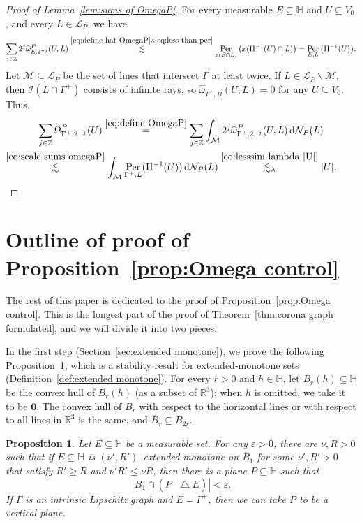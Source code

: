 \documentclass[11pt,reqno]{amsart}
\newcommand{\wwidehat}[1]{\widehat{#1}}
\renewcommand{\H}{\mathbb{H}}
\newcommand{\R}{\mathbb{R}}
\newcommand{\Z}{\mathbb{Z}}
\newcommand{\cI}{\mathcal{I}}
\newcommand{\cL}{\mathcal{L}}
\newcommand{\cM}{\mathcal{M}}
\newcommand{\cN}{\mathcal{N}}
\renewcommand{\epsilon}{\varepsilon}
\newcommand{\ud}[0]{\,\mathrm{d}}
\newcommand{\0}{\mathbf{0}}
\renewcommand{\1}{\mathbf 1}
\newcommand{\symdiff}{\mathbin{\triangle}}
\renewcommand{\subset}{\subseteq}
\renewcommand{\ge}{\geqslant}
\renewcommand{\le}{\leqslant}
\renewcommand{\setminus}{\smallsetminus}
\newtheorem{prop}[thm]{Proposition}
\theoremstyle{remark}
\DeclareMathOperator{\Per}{Per}
\begin{document}
\begin{proof}[{Proof of Lemma~\ref{lem:sums of OmegaP}}]
For every measurable $E\subset \H$ and $U\subset V_0$, and every $L\in \cL_P$, we have
  \begin{equation}\label{eq:scale sums omegaP}
    \sum_{j\in \Z} 2^j \wwidehat{\omega}^P_{E, 2^{-j}}(U, L) \stackrel{\eqref{eq:define hat OmegaP}\wedge \eqref{eq:less than per}}{\lesssim} \Per_{x(E\cap L)}\big(x(\Pi^{-1}(U)\cap L)\big) = \Per_{E,L}\big(\Pi^{-1}(U)\big).
  \end{equation}
 Let $\cM\subset \cL_P$ be the set of lines that intersect $\Gamma$ at least twice.  If $L\in \cL_P\setminus \cM$, then $\cI(L\cap \Gamma^+)$ consists of infinite rays, so $\widehat{\omega}_{\Gamma^+, R}(U,L)=0$ for any $U\subset V_0$.  Thus,
  \begin{multline*}
    \sum_{j\in \Z} \Omega^P_{\Gamma^+,2^{-j}}(U)
    \stackrel{\eqref{eq:define OmegaP}}{=}\sum_{j\in \Z} \int_{\cM} 2^j \wwidehat{\omega}^P_{\Gamma^+,2^{-j}}(U,L) \ud \cN_P(L) \\
    \stackrel{\eqref{eq:scale sums omegaP}}{\lesssim} \int_{\cM} \Per_{\Gamma^+,L}(\Pi^{-1}(U))\ud \cN_P(L)
    \stackrel{\eqref{eq:lesssim lambda |U|}}{\lesssim_\lambda} |U|. \tag*{\qedhere}
  \end{multline*}
\end{proof}

\section{Outline of proof of Proposition~\ref{prop:Omega control}}\label{sec:omega control outline}

The rest of this paper is dedicated to the proof of Proposition~\ref{prop:Omega control}.  This is the longest part of the proof of Theorem~\ref{thm:corona graph formulated}, and we will divide it into two pieces.

In the first step (Section~\ref{sec:extended monotone}), we prove the following Proposition~\ref{prop:stability of extended monotone}, which is a stability result for extended-monotone sets (Definition~\ref{def:extended monotone}).  For every $r>0$ and $h\in \H$, let $\overline{B}_r(h)\subset \H$ be the convex hull of $B_r(h)$ (as a subset of $\R^3$); when $h$ is omitted, we take it to be $\mathbf{0}$.  The convex hull of $B_r$ with respect to the horizontal lines or with respect to all lines in $\R^3$ is the same, and $\overline{B}_r\subset B_{2r}$.
\begin{prop}\label{prop:stability of extended monotone}
  Let $E\subset \H$ be a measurable set.  For any $\epsilon>0$, there are $\nu, R>0$ such that if $E\subset \H$ is $(\nu',R')$--extended monotone on $\overline{B}_1$ for some $\nu', R'>0$ that satisfy $R' \ge R$ and $\nu' R'\le \nu R$, then there is a plane $P\subset \H$ such that $$|\overline{B}_{1}\cap (P^+\symdiff E)|<\epsilon.$$  If $\Gamma$ is an intrinsic Lipschitz graph and $E=\Gamma^+$, then we can take $P$ to be a vertical plane.
\end{prop}
\end{document}
